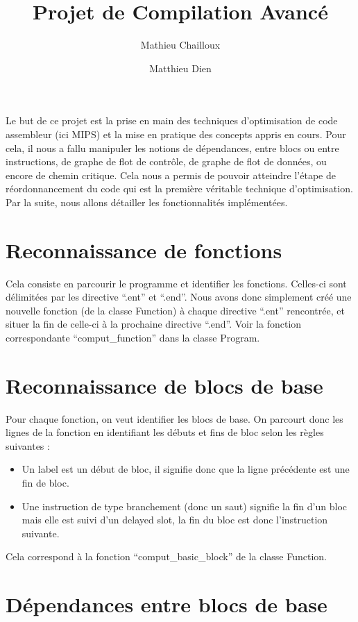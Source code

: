 \documentclass[a4paper, 11pt]{article}
\title{Projet de Compilation Avancé}
\author{Mathieu Chailloux \and Matthieu Dien}
\begin{document}
\maketitle


Le but de ce projet est la prise en main des techniques d'optimisation de code assembleur (ici MIPS) et la mise en pratique des concepts appris en cours. Pour cela, il nous a fallu manipuler les notions de dépendances, entre blocs ou entre instructions, de graphe de flot de contrôle, de graphe de flot de données, ou encore de chemin critique. Cela nous a permis de pouvoir atteindre l'étape de réordonnancement du code qui est la première véritable technique d'optimisation. Par la suite, nous allons détailler les fonctionnalités implémentées.

\section{Reconnaissance de fonctions}

Cela consiste en parcourir le programme et identifier les fonctions. Celles-ci sont délimitées par les directive ``.ent'' et ``.end''. Nous avons donc simplement créé une nouvelle fonction (de la classe Function) à chaque directive ``.ent'' rencontrée, et situer la fin de celle-ci à la prochaine directive ``.end''. Voir la fonction correspondante ``comput\_function'' dans la classe Program.

\section{Reconnaissance de blocs de base}

Pour chaque fonction, on veut identifier les blocs de base. On parcourt donc les lignes de la fonction en identifiant les débuts et fins de bloc selon les règles suivantes :

\begin{itemize}
\item Un label est un début de bloc, il signifie donc que la ligne précédente est une fin de bloc.
\item Une instruction de type branchement (donc un saut) signifie la fin d'un bloc mais elle est suivi d'un delayed slot, la fin du bloc est donc l'instruction suivante.
\end{itemize}

Cela correspond à la fonction ``comput\_basic\_block'' de la classe Function.

\section{Dépendances entre blocs de base}
\end{document}
